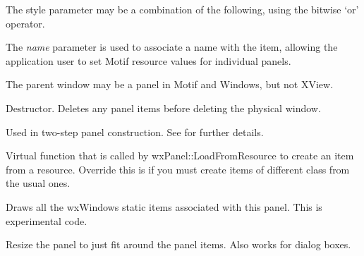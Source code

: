 The style parameter may be a combination of the following, using the bitwise `or' operator.

\begin{twocollist}\itemsep=0pt
\end{twocollist}

The {\it name} parameter is used to associate a name with the item,
allowing the application user to set Motif resource values for
individual panels.

The parent window may be a panel in Motif and Windows, but not XView.



Destructor.  Deletes any panel items before deleting the physical window.



Used in two-step panel construction. See 
for further details.



Virtual function that is called by wxPanel::LoadFromResource to create an item from a resource.
Override this is if you must create items of different class from the usual ones.



Draws all the wxWindows static items associated with this panel. This is
experimental code.



Resize the panel to just fit around the panel items. Also works for dialog boxes.


